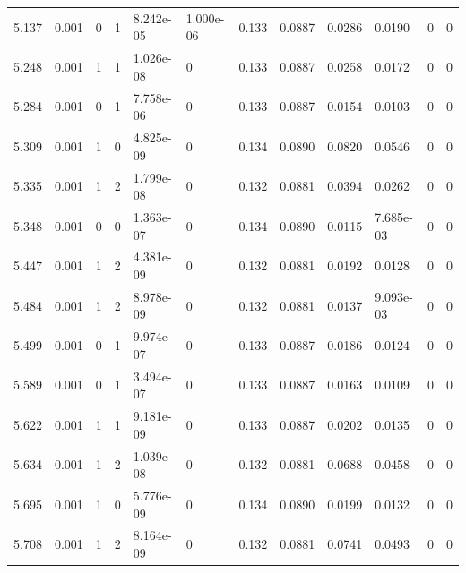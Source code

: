 \documentclass[preview]{standalone}
\begin{document}
{{{\begin{tabular}{L{1.2cm}C{1.2cm} C{0.3cm}C{0.5cm} C{1.4cm}C{1.4cm} C{1.4cm}C{1.4cm} C{1.6cm}C{1.6cm} C{1.6cm}C{1.6cm}}
  5.137  &  0.001  & 0     &  1 &  8.242e-05  & 1.000e-06  &  0.133&   0.0887& 0.0286 & 0.0190   &  0 & 0  \\ 
  5.248  &  0.001  & 1     &  1 &  1.026e-08  & 0  &  0.133&   0.0887& 0.0258 & 0.0172   &  0 & 0  \\ 
  5.284  &  0.001  & 0     &  1 &  7.758e-06  & 0  &  0.133&   0.0887& 0.0154 & 0.0103   &  0 & 0  \\ 
  5.309  &  0.001  & 1     &  0 &  4.825e-09  & 0  &  0.134&   0.0890& 0.0820 & 0.0546   &  0 & 0  \\ 
  5.335  &  0.001  & 1     &  2 &  1.799e-08  & 0  &  0.132&   0.0881& 0.0394 & 0.0262   &  0 & 0  \\ 
  5.348  &  0.001  & 0     &  0 &  1.363e-07  & 0  &  0.134&   0.0890& 0.0115 & 7.685e-03   &  0 & 0  \\ 
  5.447  &  0.001  & 1     &  2 &  4.381e-09  & 0  &  0.132&   0.0881& 0.0192 & 0.0128   &  0 & 0  \\ 
  5.484  &  0.001  & 1     &  2 &  8.978e-09  & 0  &  0.132&   0.0881& 0.0137 & 9.093e-03   &  0 & 0  \\ 
  5.499  &  0.001  & 0     &  1 &  9.974e-07  & 0  &  0.133&   0.0887& 0.0186 & 0.0124   &  0 & 0  \\ 
  5.589  &  0.001  & 0     &  1 &  3.494e-07  & 0  &  0.133&   0.0887& 0.0163 & 0.0109   &  0 & 0  \\ 
  5.622  &  0.001  & 1     &  1 &  9.181e-09  & 0  &  0.133&   0.0887& 0.0202 & 0.0135   &  0 & 0  \\ 
  5.634  &  0.001  & 1     &  2 &  1.039e-08  & 0  &  0.132&   0.0881& 0.0688 & 0.0458   &  0 & 0  \\ 
  5.695  &  0.001  & 1     &  0 &  5.776e-09  & 0  &  0.134&   0.0890& 0.0199 & 0.0132   &  0 & 0  \\ 
  5.708  &  0.001  & 1     &  2 &  8.164e-09  & 0  &  0.132&   0.0881& 0.0741 & 0.0493   &  0 & 0  \\ 
\hline 
\end{tabular} 

}}}
\end{document}
